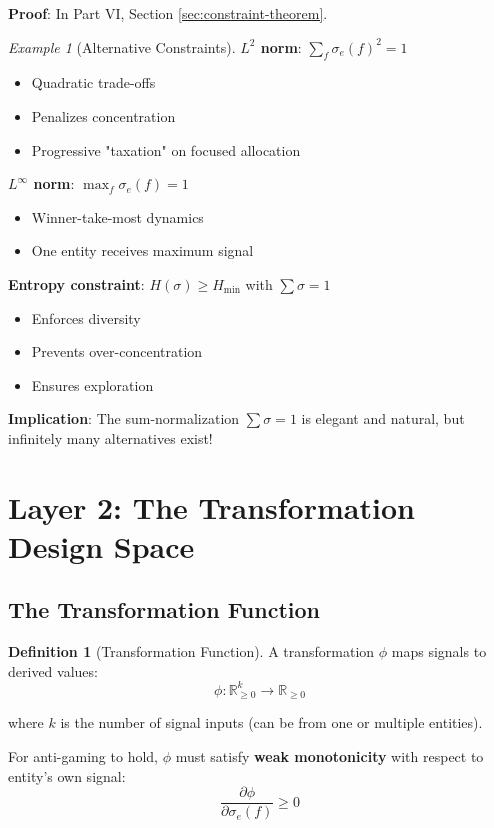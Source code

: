 \documentclass[11pt,a4paper]{article}
\theoremstyle{definition}
\newtheorem{definition}[theorem]{Definition}
\theoremstyle{remark}
\newtheorem{example}[theorem]{Example}
\begin{document}
\textbf{Proof}: In Part VI, Section \ref{sec:constraint-theorem}.

\begin{example}[Alternative Constraints]
\textbf{$L^2$ norm}: $\sum_f \sigma_e(f)^2 = 1$
\begin{itemize}
\item Quadratic trade-offs
\item Penalizes concentration
\item Progressive "taxation" on focused allocation
\end{itemize}

\textbf{$L^\infty$ norm}: $\max_f \sigma_e(f) = 1$
\begin{itemize}
\item Winner-take-most dynamics
\item One entity receives maximum signal
\end{itemize}

\textbf{Entropy constraint}: $H(\sigma) \ge H_{\min}$ with $\sum \sigma = 1$
\begin{itemize}
\item Enforces diversity
\item Prevents over-concentration
\item Ensures exploration
\end{itemize}
\end{example}

\textbf{Implication}: The sum-normalization $\sum \sigma = 1$ is elegant and natural, but infinitely many alternatives exist!

\section{Layer 2: The Transformation Design Space}

\subsection{The Transformation Function}

\begin{definition}[Transformation Function]
A transformation $\phi$ maps signals to derived values:
\[ \phi: \mathbb{R}_{\ge 0}^k \to \mathbb{R}_{\ge 0} \]

where $k$ is the number of signal inputs (can be from one or multiple entities).

For anti-gaming to hold, $\phi$ must satisfy \textbf{weak monotonicity} with respect to entity's own signal:
\[ \frac{\partial \phi}{\partial \sigma_e(f)} \ge 0 \]
\end{definition}
\end{document}
